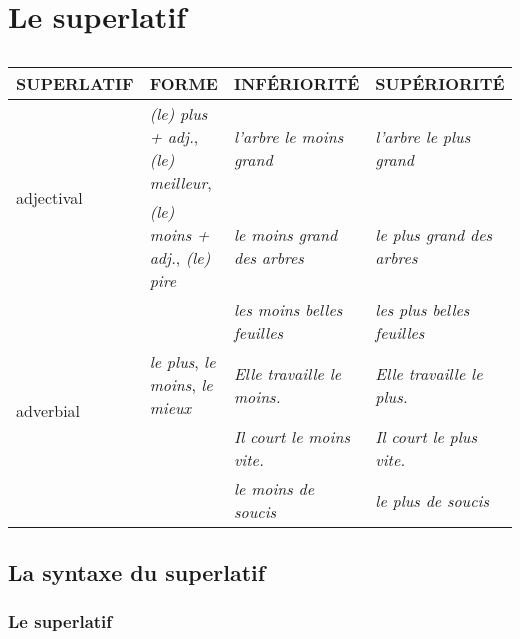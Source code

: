 \documentclass[UTF8]{report}
\begin{document}
\section{Le superlatif}


\begin{table}[H]
    \centering
    \small
    \begin{tabular}{|p{2.5cm}|p{4.5cm}|p{4.5cm}|p{4.5cm}|}
    \hline
    \rowcolor{cyan!20}
    \textbf{SUPERLATIF} & \textbf{FORME} & \textbf{INFÉRIORITÉ} & \textbf{SUPÉRIORITÉ} \\
    \hline
    \multirow{2}{*}{adjectival} & \textit{(le) plus + adj.}, \textit{(le) meilleur}, & \textit{l'arbre le moins grand} & \textit{l'arbre le plus grand} \\
    & \textit{(le) moins + adj.}, \textit{(le) pire} & \textit{le moins grand des arbres} & \textit{le plus grand des arbres} \\
    & & \textit{les moins belles feuilles} & \textit{les plus belles feuilles} \\
    \hline
    \multirow{2}{*}{adverbial} & \textit{le plus}, \textit{le moins}, \textit{le mieux} & \textit{Elle travaille le moins.} & \textit{Elle travaille le plus.} \\
    & & \textit{Il court le moins vite.} & \textit{Il court le plus vite.} \\
    & & \textit{le moins de soucis} & \textit{le plus de soucis} \\
    \hline
    \end{tabular}
    \caption{}
\end{table}

\subsection{La syntaxe du superlatif}
\subsubsection{Le superlatif}
\end{document}
